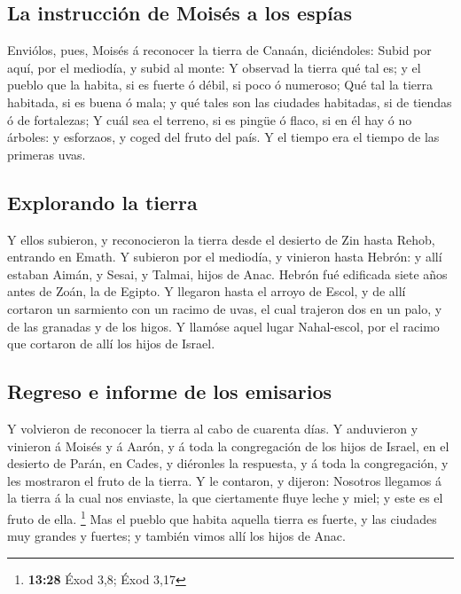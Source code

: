 \hypertarget{la-instrucciuxf3n-de-moisuxe9s-a-los-espuxedas}{%
\subsection{La instrucción de Moisés a los
espías}\label{la-instrucciuxf3n-de-moisuxe9s-a-los-espuxedas}}

 Enviólos, pues, Moisés á reconocer la tierra de Canaán,
diciéndoles: Subid por aquí, por el mediodía, y subid al monte:
 Y observad la tierra qué tal es; y el pueblo que la
habita, si es fuerte ó débil, si poco ó numeroso;  Qué tal
la tierra habitada, si es buena ó mala; y qué tales son las ciudades
habitadas, si de tiendas ó de fortalezas;  Y cuál sea el
terreno, si es pingüe ó flaco, si en él hay ó no árboles: y esforzaos, y
coged del fruto del país. Y el tiempo era el tiempo de las primeras
uvas.

\hypertarget{explorando-la-tierra}{%
\subsection{Explorando la tierra}\label{explorando-la-tierra}}

 Y ellos subieron, y reconocieron la tierra desde el
desierto de Zin hasta Rehob, entrando en Emath.  Y subieron
por el mediodía, y vinieron hasta Hebrón: y allí estaban Aimán, y Sesai,
y Talmai, hijos de Anac. Hebrón fué edificada siete años antes de Zoán,
la de Egipto.  Y llegaron hasta el arroyo de Escol, y de
allí cortaron un sarmiento con un racimo de uvas, el cual trajeron dos
en un palo, y de las granadas y de los higos.  Y llamóse
aquel lugar Nahal-escol, por el racimo que cortaron de allí los hijos de
Israel.

\hypertarget{regreso-e-informe-de-los-emisarios}{%
\subsection{Regreso e informe de los
emisarios}\label{regreso-e-informe-de-los-emisarios}}

 Y volvieron de reconocer la tierra al cabo de cuarenta
días.  Y anduvieron y vinieron á Moisés y á Aarón, y á toda
la congregación de los hijos de Israel, en el desierto de Parán, en
Cades, y diéronles la respuesta, y á toda la congregación, y les
mostraron el fruto de la tierra.  Y le contaron, y dijeron:
Nosotros llegamos á la tierra á la cual nos enviaste, la que ciertamente
fluye leche y miel; y este es el fruto de ella. \footnote{\textbf{13:28}
  Éxod 3,8; Éxod 3,17}  Mas el pueblo que habita aquella
tierra es fuerte, y las ciudades muy grandes y fuertes; y también vimos
allí los hijos de Anac.


